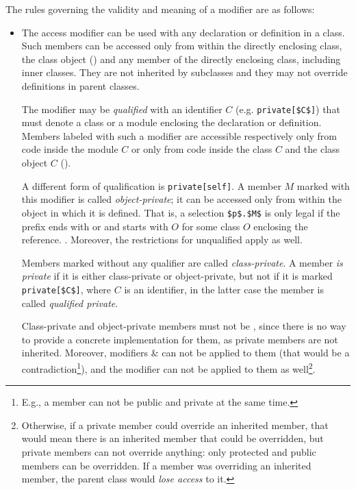 The rules governing the validity and meaning of a modifier are as follows: 
\begin{itemize}
\item
The  access modifier can be used with any declaration or definition in a class. Such members can be accessed only from within the directly enclosing class, the class object () and any member of the directly enclosing class, including inner classes. They are not inherited by subclasses and they may not override definitions in parent classes. 

The modifier may be {\em qualified} with an identifier $C$ (e.g. \lstinline!private[$C$]!) that must denote a class or a module enclosing the declaration or definition. Members labeled with such a modifier are accessible respectively only from code inside the module $C$ or only from code inside the class $C$ and the class object $C$ (). 

A different form of qualification is \lstinline!private[self]!. A member $M$ marked with this modifier is called {\em object-private}; it can be accessed only from within the object in which it is defined. That is, a selection \lstinline!$p$.$M$! is only legal if the prefix ends with  or  and starts with $O$ for some class $O$ enclosing the reference. . Moreover, the restrictions for unqualified  apply as well. 

Members marked  without any qualifier are called {\em class-private}. A member {\em is private} if it is either class-private or object-private, but not if it is marked \lstinline!private[$C$]!, where $C$ is an identifier, in the latter case the member is called {\em qualified private}. 

Class-private and object-private members must not be , since there is no way to provide a concrete implementation for them, as private members are not inherited. Moreover, modifiers  \&  can not be applied to them (that would be a contradiction\footnote{E.g., a member can not be public and private at the same time.}), and the modifier  can not be applied to them as well\footnote{Otherwise, if a private member could override an inherited member, that would mean there is an inherited member that could be overridden, but private members can not override anything: only protected and public members can be overridden. If a member was overriding an inherited member, the parent class would {\em lose access} to it.}. 


\end{itemize}
